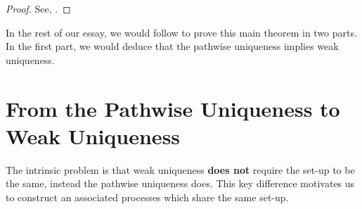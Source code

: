 \documentclass[8pt,onesided]{article}
\begin{document}
\begin{proof}
    See, \cite[Lemma 10.1]{rogers2000diffusions2}.
\end{proof}

In the rest of our essay, we would follow \cite{rogers2000diffusions2} to prove this main theorem in two parts. In the first part, we would deduce that the pathwise uniqueness implies weak uniqueness. 

\section{From the Pathwise Uniqueness to Weak Uniqueness}

The intrinsic problem is that weak uniqueness \textbf{does not} require the set-up to be the same, instead the pathwise uniqueness does. This key difference motivates us to construct an associated processes which share the same set-up. 
\end{document}
